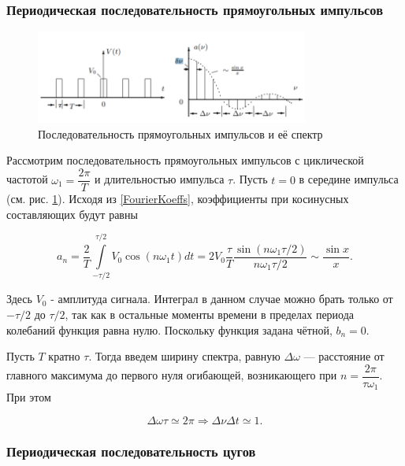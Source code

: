 \documentclass[a4paper,12pt]{article} %
\begin{document}
\subsubsection*{Периодическая последовательность прямоугольных импульсов}

\begin{figure}[h]
    \centering
    \includegraphics[width=0.8\textwidth]{2.png} 
    \caption{Последовательность прямоугольных импульсов и её спектр}
    \label{rectangularImpulses}
\end{figure}

Рассмотрим последовательность прямоугольных импульсов с циклической частотой $\omega_1 = \dfrac{2\pi}{T}$ и длительностью импульса $\tau$. Пусть $t = 0$ в середине импульса (см. рис. \ref{rectangularImpulses}). Исходя из \eqref{FourierKoeffs}, коэффициенты при косинусных составляющих будут равны

\begin{equation}
    a_n = \dfrac{2}{T} \int\limits_{-\tau/2}^{\tau/2} V_0 \cos\left(n\omega_1 t\right) dt = 2 V_0 \dfrac{\tau}{T} \dfrac{\sin\left(n\omega_1\tau/2\right)}{n\omega_1\tau/2} \sim \dfrac{\sin x}{x}.
\end{equation}

Здесь $V_0$ - амплитуда сигнала. Интеграл в данном случае можно брать только от $-\tau/2$ до $\tau/2$, так как в остальные моменты времени в пределах периода колебаний функция равна нулю. Поскольку функция задана чётной, $b_n = 0$. 

Пусть $T$ кратно $\tau$. Тогда введем ширину спектра, равную $\Delta \omega$ --- расстояние от главного максимума до первого нуля огибающей, возникающего при $n = \dfrac{2\pi}{\tau \omega_1}$. При этом

\begin{equation}
    \Delta \omega \tau \simeq 2\pi \Rightarrow \Delta \nu \Delta t \simeq 1.
\end{equation}

\subsubsection*{Периодическая последовательность цугов}
\end{document}
